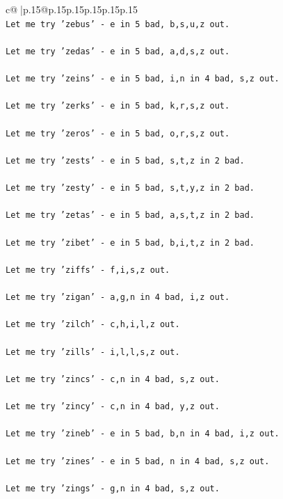 \documentclass{article}
\begin{document}
{\begin{supertabular}{c@{$\;$}|p{.15\linewidth}@{}p{.15\linewidth}p{.15\linewidth}p{.15\linewidth}p{.15\linewidth}p{.15\linewidth}}
{{{\\ 
\texttt{Let me try 'zebus' {-} e in 5 bad, b,s,u,z out. } \\
\\ 
\texttt{Let me try 'zedas' {-} e in 5 bad, a,d,s,z out. } \\
\\ 
\texttt{Let me try 'zeins' {-} e in 5 bad, i,n in 4 bad, s,z out. } \\
\\ 
\texttt{Let me try 'zerks' {-} e in 5 bad, k,r,s,z out. } \\
\\ 
\texttt{Let me try 'zeros' {-} e in 5 bad, o,r,s,z out. } \\
\\ 
\texttt{Let me try 'zests' {-} e in 5 bad, s,t,z in 2 bad. } \\
\\ 
\texttt{Let me try 'zesty' {-} e in 5 bad, s,t,y,z in 2 bad. } \\
\\ 
\texttt{Let me try 'zetas' {-} e in 5 bad, a,s,t,z in 2 bad. } \\
\\ 
\texttt{Let me try 'zibet' {-} e in 5 bad, b,i,t,z in 2 bad. } \\
\\ 
\texttt{Let me try 'ziffs' {-} f,i,s,z out. } \\
\\ 
\texttt{Let me try 'zigan' {-} a,g,n in 4 bad, i,z out. } \\
\\ 
\texttt{Let me try 'zilch' {-} c,h,i,l,z out. } \\
\\ 
\texttt{Let me try 'zills' {-} i,l,l,s,z out. } \\
\\ 
\texttt{Let me try 'zincs' {-} c,n in 4 bad, s,z out. } \\
\\ 
\texttt{Let me try 'zincy' {-} c,n in 4 bad, y,z out. } \\
\\ 
\texttt{Let me try 'zineb' {-} e in 5 bad, b,n in 4 bad, i,z out. } \\
\\ 
\texttt{Let me try 'zines' {-} e in 5 bad, n in 4 bad, s,z out. } \\
\\ 
\texttt{Let me try 'zings' {-} g,n in 4 bad, s,z out. } \\
}}}
\end{supertabular}}
\end{document}
